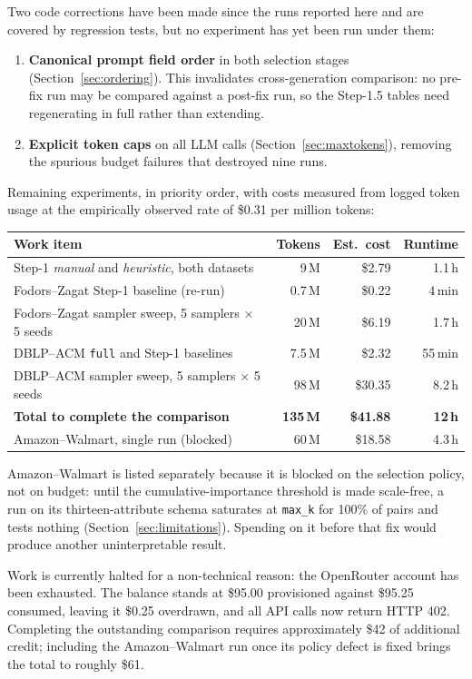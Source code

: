 \documentclass[11pt]{article}
\begin{document}
Two code corrections have been made since the runs reported here and are covered by
regression tests, but no experiment has yet been run under them:

\begin{enumerate}
\item \textbf{Canonical prompt field order} in both selection stages
(Section~\ref{sec:ordering}). This invalidates cross-generation comparison: no
pre-fix run may be compared against a post-fix run, so the Step-1.5 tables need
regenerating in full rather than extending.
\item \textbf{Explicit token caps} on all LLM calls (Section~\ref{sec:maxtokens}),
removing the spurious budget failures that destroyed nine runs.
\end{enumerate}

Remaining experiments, in priority order, with costs measured from logged token usage
at the empirically observed rate of \$0.31 per million tokens:

\begin{center}
\small
\begin{tabular}{lrrr}
\toprule
Work item & Tokens & Est.\ cost & Runtime \\
\midrule
Step-1 \emph{manual} and \emph{heuristic}, both datasets & 9\,M & \$2.79 & 1.1\,h \\
Fodors--Zagat Step-1 baseline (re-run) & 0.7\,M & \$0.22 & 4\,min \\
Fodors--Zagat sampler sweep, 5 samplers $\times$ 5 seeds & 20\,M & \$6.19 & 1.7\,h \\
DBLP--ACM \texttt{full} and Step-1 baselines & 7.5\,M & \$2.32 & 55\,min \\
DBLP--ACM sampler sweep, 5 samplers $\times$ 5 seeds & 98\,M & \$30.35 & 8.2\,h \\
\midrule
\textbf{Total to complete the comparison} & \textbf{135\,M} & \textbf{\$41.88} & \textbf{12\,h} \\
\midrule
Amazon--Walmart, single run (blocked) & 60\,M & \$18.58 & 4.3\,h \\
\bottomrule
\end{tabular}
\end{center}

Amazon--Walmart is listed separately because it is blocked on the selection policy,
not on budget: until the cumulative-importance threshold is made scale-free, a run on
its thirteen-attribute schema saturates at \texttt{max\_k} for 100\% of pairs and
tests nothing (Section~\ref{sec:limitations}). Spending on it before that fix would
produce another uninterpretable result.

Work is currently halted for a non-technical reason: the OpenRouter account has been
exhausted. The balance stands at \$95.00 provisioned against \$95.25 consumed, leaving
it \$0.25 overdrawn, and all API calls now return HTTP 402. Completing the outstanding
comparison requires approximately \$42 of additional credit; including the
Amazon--Walmart run once its policy defect is fixed brings the total to roughly \$61.
\end{document}
